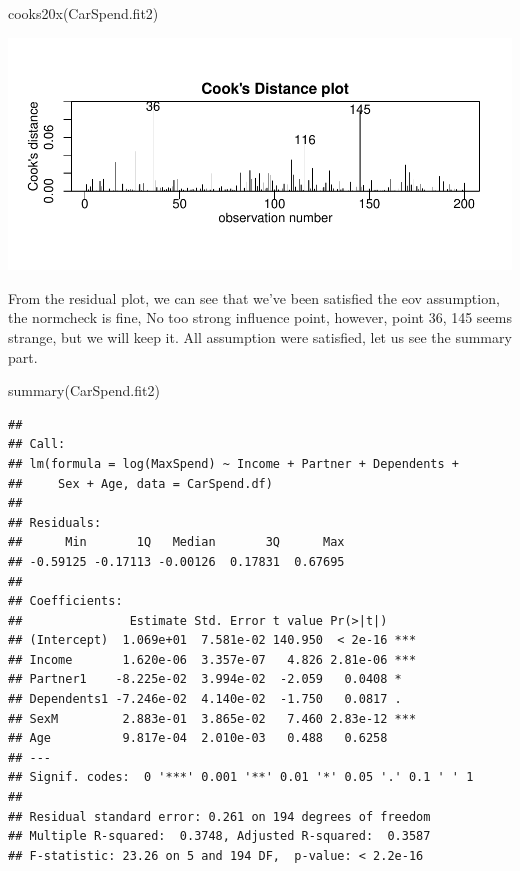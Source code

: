 \documentclass[
]{article}
\newenvironment{Shaded}{\begin{snugshade}}{\end{snugshade}}
\newcommand{\FunctionTok}[1]{\textcolor[rgb]{0.00,0.00,0.00}{#1}}
\newcommand{\NormalTok}[1]{#1}
\begin{document}
\begin{Shaded}
\begin{Highlighting}[]
\FunctionTok{cooks20x}\NormalTok{(CarSpend.fit2)}
\end{Highlighting}
\end{Shaded}

\includegraphics{STATS201_2022_SWU_A3_files/figure-latex/unnamed-chunk-4-3.pdf}

From the residual plot, we can see that we've been satisfied the eov
assumption, the normcheck is fine, No too strong influence point,
however, point 36, 145 seems strange, but we will keep it. All
assumption were satisfied, let us see the summary part.

\begin{Shaded}
\begin{Highlighting}[]
\FunctionTok{summary}\NormalTok{(CarSpend.fit2)}
\end{Highlighting}
\end{Shaded}

\begin{verbatim}
## 
## Call:
## lm(formula = log(MaxSpend) ~ Income + Partner + Dependents + 
##     Sex + Age, data = CarSpend.df)
## 
## Residuals:
##      Min       1Q   Median       3Q      Max 
## -0.59125 -0.17113 -0.00126  0.17831  0.67695 
## 
## Coefficients:
##               Estimate Std. Error t value Pr(>|t|)    
## (Intercept)  1.069e+01  7.581e-02 140.950  < 2e-16 ***
## Income       1.620e-06  3.357e-07   4.826 2.81e-06 ***
## Partner1    -8.225e-02  3.994e-02  -2.059   0.0408 *  
## Dependents1 -7.246e-02  4.140e-02  -1.750   0.0817 .  
## SexM         2.883e-01  3.865e-02   7.460 2.83e-12 ***
## Age          9.817e-04  2.010e-03   0.488   0.6258    
## ---
## Signif. codes:  0 '***' 0.001 '**' 0.01 '*' 0.05 '.' 0.1 ' ' 1
## 
## Residual standard error: 0.261 on 194 degrees of freedom
## Multiple R-squared:  0.3748, Adjusted R-squared:  0.3587 
## F-statistic: 23.26 on 5 and 194 DF,  p-value: < 2.2e-16
\end{verbatim}
\end{document}
